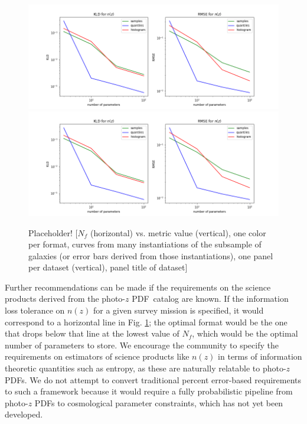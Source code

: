 \documentclass[\docopts]{\docclass}
\newcommand{\pz}{photo-$z$ PDF}
\begin{document}
\begin{figure}
  \includegraphics[width=0.9\columnwidth]{figures/stacked_placeholder.png}\\
  \includegraphics[width=0.9\columnwidth]{figures/stacked_placeholder.png}
  \caption{Placeholder! [$N_{f}$ (horizontal) vs. metric value (vertical), one 
color per format, curves from many instantiations of the subsample of galaxies 
(or error bars derived from those instantiations), one panel per dataset 
(vertical), panel title of dataset]
  \label{fig:stacked}}
\end{figure}


Further recommendations can be made if the requirements on the science products 
derived from the \pz\ catalog are known.  If the information loss tolerance on 
$n(z)$ for a given survey mission is specified, it would correspond to a 
horizontal line in Fig. \ref{fig:stacked}; the optimal format would be the one 
that drops below that line at the lowest value of $N_{f}$, which would be the 
optimal number of parameters to store.  We encourage the community to specify 
the requirements on estimators of science products like $n(z)$ in terms of 
information theoretic quantities such as entropy, as these are naturally 
relatable to \pz s.  We do not attempt to convert traditional percent 
error-based requirements to such a framework because it would require a fully 
probabilistic pipeline from \pz s to cosmological parameter constraints, which 
has not yet been developed.
\end{document}
